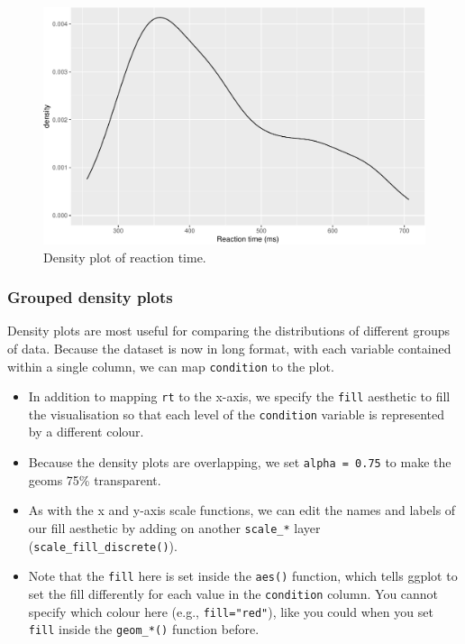 \documentclass[
  english,
  doc,floatsintext]{apa6}
\providecommand{\tightlist}{%
  \setlength{\itemsep}{0pt}\setlength{\parskip}{0pt}}
\begin{document}
\begin{figure}

{\centering \includegraphics[width=1\linewidth]{images/density-rt-1} 

}

\caption{Density plot of reaction time.}\label{fig:density-rt}
\end{figure}

\hypertarget{grouped-density-plots}{%
\subsubsection{Grouped density plots}\label{grouped-density-plots}}

Density plots are most useful for comparing the distributions of different groups of data. Because the dataset is now in long format, with each variable contained within a single column, we can map \texttt{condition} to the plot.

\begin{itemize}
\tightlist
\item
  In addition to mapping \texttt{rt} to the x-axis, we specify the \texttt{fill} aesthetic to fill the visualisation so that each level of the \texttt{condition} variable is represented by a different colour.
\item
  Because the density plots are overlapping, we set \texttt{alpha\ =\ 0.75} to make the geoms 75\% transparent.
\item
  As with the x and y-axis scale functions, we can edit the names and labels of our fill aesthetic by adding on another \texttt{scale\_*} layer (\texttt{scale\_fill\_discrete()}).
\item
  Note that the \texttt{fill} here is set inside the \texttt{aes()} function, which tells ggplot to set the fill differently for each value in the \texttt{condition} column. You cannot specify which colour here (e.g., \texttt{fill="red"}), like you could when you set \texttt{fill} inside the \texttt{geom\_*()} function before.
\end{itemize}
\end{document}
